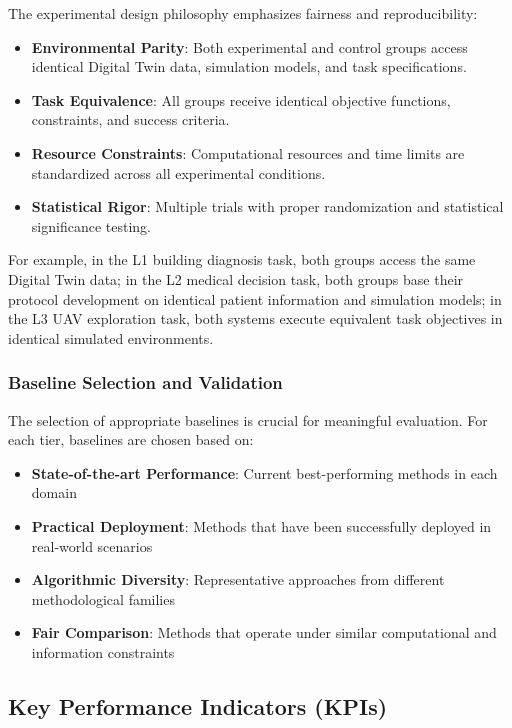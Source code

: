 The experimental design philosophy emphasizes fairness and reproducibility:

\begin{itemize}
\item \textbf{Environmental Parity}: Both experimental and control groups access identical Digital Twin data, simulation models, and task specifications.
\item \textbf{Task Equivalence}: All groups receive identical objective functions, constraints, and success criteria.
\item \textbf{Resource Constraints}: Computational resources and time limits are standardized across all experimental conditions.
\item \textbf{Statistical Rigor}: Multiple trials with proper randomization and statistical significance testing.
\end{itemize}

For example, in the L1 building diagnosis task, both groups access the same Digital Twin data; in the L2 medical decision task, both groups base their protocol development on identical patient information and simulation models; in the L3 UAV exploration task, both systems execute equivalent task objectives in identical simulated environments.

\subsubsection{Baseline Selection and Validation}

The selection of appropriate baselines is crucial for meaningful evaluation. For each tier, baselines are chosen based on:

\begin{itemize}
\item \textbf{State-of-the-art Performance}: Current best-performing methods in each domain
\item \textbf{Practical Deployment}: Methods that have been successfully deployed in real-world scenarios
\item \textbf{Algorithmic Diversity}: Representative approaches from different methodological families
\item \textbf{Fair Comparison}: Methods that operate under similar computational and information constraints
\end{itemize}

\subsection{Key Performance Indicators (KPIs)}

